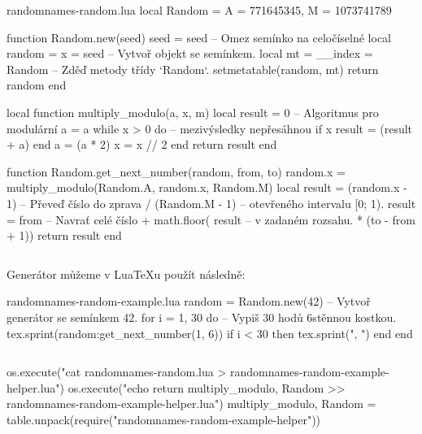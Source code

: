 \documentclass{csbulletin}
\let\exampleoutput\emph
\newcommand\myinputminted[3][]{%
  \inputminted[#1]{#2}{#3}%
}
\newcommand\myinputminted[3][]{%
  \inputminted[#1]{#2}{code-placeholder.#2}%
}
\begin{document}
\begin{filecontents}{randomnames-random.lua}
local Random = { A = 771645345, M = 1073741789 }

function Random.new(seed)
  seed = seed                      -- Omez semínko na celočíselné
  local random = { x = seed }      -- Vytvoř objekt se semínkem.
  local mt = { __index = Random }  -- Zděď metody třídy `Random`.
  setmetatable(random, mt)
  return random
end

local function multiply_modulo(a, x, m)
  local result = 0                 -- Algoritmus pro modulární
  a = a %
  while x > 0 do                   -- mezivýsledky nepřesáhnou
    if x %
      result = (result + a) %
    end
    a = (a * 2) %
    x = x // 2
  end
  return result
end

function Random.get_next_number(random, from, to)
  random.x = multiply_modulo(Random.A, random.x, Random.M)
  local result = (random.x - 1)    -- Převeď číslo do zprava
               / (Random.M - 1)    -- otevřeného intervalu [0; 1).
  result = from                    -- Navrať celé číslo
         + math.floor( result      -- v zadaném rozsahu.
                     * (to - from + 1))
  return result
end

\end{filecontents}
\myinputminted{lua}{randomnames-random.lua}

Generátor můžeme v Lua\TeX u použít následně:

\begin{filecontents}{randomnames-random-example.lua}
random = Random.new(42)        -- Vytvoř generátor se semínkem 42.
for i = 1, 30 do               -- Vypiš 30 hodů 6stěnnou kostkou.
  tex.sprint(random:get_next_number(1, 6))
  if i < 30 then tex.sprint(", ") end
end
\end{filecontents}
\myinputminted[linenos=false]{lua}{randomnames-random-example.lua}

\noindent
\begin{luacode*}
os.execute("cat randomnames-random.lua > randomnames-random-example-helper.lua")
os.execute("echo return {multiply_modulo, Random} >> randomnames-random-example-helper.lua")
multiply_modulo, Random = table.unpack(require("randomnames-random-example-helper"))
\end{luacode*}
\exampleoutput{}
\end{document}
